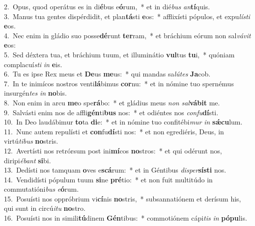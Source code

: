 {2.~}Opus, quod operátus es in di\textbf{é}bus e\textbf{ó}rum,~* et in dié\textit{bus} \textit{an}\textbf{tí}quis.\\
{3.~}Manus tua gentes dispérdidit, et plan\textbf{tá}sti \textbf{e}os:~* afflixísti pópulos, et expu\textit{lí}\textit{sti} \textbf{e}os.\\
{4.~}Nec enim in gládio suo posse\textbf{dé}runt \textbf{ter}ram,~* et bráchium eórum non sal\textit{vá}\textit{vit} \textbf{e}os:\\
{5.~}Sed déxtera tua, et bráchium tuum, et illuminátio \textbf{vul}tus \textbf{tu}i,~* quóniam complacuí\textit{sti} \textit{in} \textbf{e}is.\\
{6.~}Tu es ipse Rex meus et \textbf{De}us \textbf{me}us:~* qui mandas sa\textit{lú}\textit{tes} \textbf{Ja}cob.\\
{7.~}In te inimícos nostros venti\textbf{lá}bimus \textbf{cor}nu:~* et in nómine tuo spernémus insurgén\textit{tes} \textit{in} \textbf{no}bis.\\
{8.~}Non enim in arcu \textbf{me}o spe\textbf{rá}bo:~* et gládius meus \textit{non} \textit{sal}\textbf{vá}\textbf{bit} me.\\
{9.~}Salvásti enim nos de affli\textbf{gén}ti\textbf{bus} nos:~* et odiéntes nos \textit{con}\textit{fu}\textbf{dí}sti.\\
{10.~}In Deo laudábimur \textbf{to}ta \textbf{di}e:~* et in nómine tuo confitébi\textit{mur} \textit{in} \textbf{sǽ}\textbf{cu}lum.\\
{11.~}Nunc autem repulísti et \textbf{con}fu\textbf{dí}sti nos:~* et non egrediéris, Deus, in virtú\textit{ti}\textit{bus} \textbf{no}stris.\\
{12.~}Avertísti nos retrórsum post ini\textbf{mí}cos \textbf{no}stros:~* et qui odérunt nos, diripi\textit{é}\textit{bant} \textbf{si}bi.\\
{13.~}Dedísti nos tamquam \textbf{o}ves e\textbf{scá}rum:~* et in Géntibus \textit{di}\textit{sper}\textbf{sí}\textbf{sti} nos.\\
{14.~}Vendidísti pópulum tuum \textbf{si}ne \textbf{pré}tio:~* et non fuit multitúdo in commutatióni\textit{bus} \textit{e}\textbf{ó}rum.\\
{15.~}Posuísti nos oppróbrium vi\textbf{cí}nis \textbf{no}stris,~* subsannatiónem et derísum his, qui sunt in circú\textit{i}\textit{tu} \textbf{no}stro.\\
{16.~}Posuísti nos in simili\textbf{tú}dinem \textbf{Gén}tibus:~* commotiónem cápi\textit{tis} \textit{in} \textbf{pó}\textbf{pu}lis.\\

